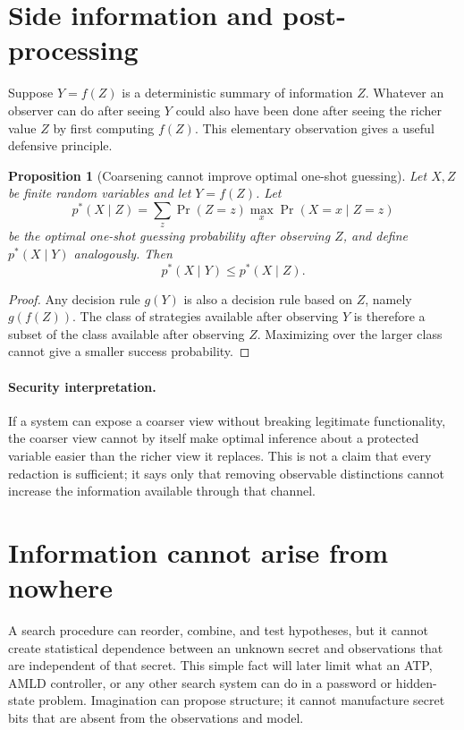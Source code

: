 \documentclass[11pt,oneside]{book}
\newtheorem{proposition}[theorem]{Proposition}
\theoremstyle{definition}
\theoremstyle{remark}
\newcommand{\Prb}{\operatorname{Pr}}
\begin{document}
\section{Side information and post-processing}
\label{sec:data-processing-guess}
Suppose $Y=f(Z)$ is a deterministic summary of information $Z$. Whatever an observer can do after seeing $Y$ could also have been done after seeing the richer value $Z$ by first computing $f(Z)$. This elementary observation gives a useful defensive principle.

\begin{proposition}[Coarsening cannot improve optimal one-shot guessing]
Let $X,Z$ be finite random variables and let $Y=f(Z)$. Let
\[
p^*(X\mid Z)=\sum_z \Prb(Z=z)\max_x \Prb(X=x\mid Z=z)
\]
be the optimal one-shot guessing probability after observing $Z$, and define $p^*(X\mid Y)$ analogously. Then
\[
p^*(X\mid Y)\le p^*(X\mid Z).
\]
\end{proposition}

\begin{proof}
Any decision rule $g(Y)$ is also a decision rule based on $Z$, namely $g(f(Z))$. The class of strategies available after observing $Y$ is therefore a subset of the class available after observing $Z$. Maximizing over the larger class cannot give a smaller success probability.
\end{proof}

\paragraph{Security interpretation.} If a system can expose a coarser view without breaking legitimate functionality, the coarser view cannot by itself make optimal inference about a protected variable easier than the richer view it replaces. This is not a claim that every redaction is sufficient; it says only that removing observable distinctions cannot increase the information available through that channel.

\section{Information cannot arise from nowhere}
A search procedure can reorder, combine, and test hypotheses, but it cannot create statistical dependence between an unknown secret and observations that are independent of that secret. This simple fact will later limit what an ATP, AMLD controller, or any other search system can do in a password or hidden-state problem. Imagination can propose structure; it cannot manufacture secret bits that are absent from the observations and model.
\end{document}
